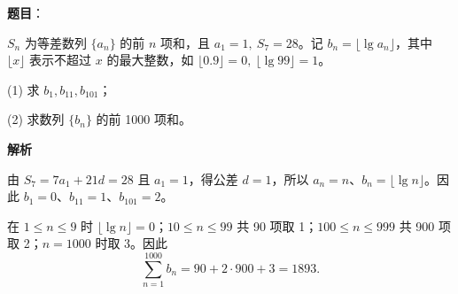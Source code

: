 \begin{answer}

\textbf{题目}：

\(S_n\) 为等差数列 \(\{a_n\}\) 的前 \(n\) 项和，且 \(a_1=1,\ S_7=28\)。记 \(b_n=\lfloor\lg a_n\rfloor\)，其中 \(\lfloor x\rfloor\) 表示不超过 \(x\) 的最大整数，如 \(\lfloor0.9\rfloor=0,\ \lfloor\lg99\rfloor=1\)。

   (1) 求 \(b_1,b_{11},b_{101}\)；

   (2) 求数列 \(\{b_n\}\) 的前 1000 项和。

\textbf{解析}


由 \(S_7=7a_1+21d=28\) 且 \(a_1=1\)，得公差 \(d=1\)，所以 \(a_n=n\)、\(b_n=\lfloor\lg n\rfloor\)。因此 \(b_1=0\)、\(b_{11}=1\)、\(b_{101}=2\)。


在 \(1\le n\le9\) 时 \(\lfloor\lg n\rfloor=0\)；\(10\le n\le99\) 共 90 项取 1；\(100\le n\le999\) 共 900 项取 2；\(n=1000\) 时取 3。因此
\nopagebreak[4]
\[
\sum_{n=1}^{1000}b_n=90+2\cdot900+3=1893.
\]



\end{answer}
